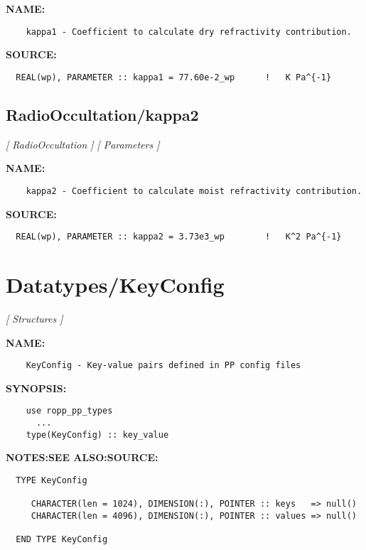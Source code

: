 \label{ch:robo93}
\label{ch:RadioOccultation_kappa1}
\textbf{NAME:}\hspace{0.08in}\begin{Verbatim}
    kappa1 - Coefficient to calculate dry refractivity contribution.
\end{Verbatim}
\textbf{SOURCE:}\hspace{0.08in}\begin{Verbatim}
  REAL(wp), PARAMETER :: kappa1 = 77.60e-2_wp      !   K Pa^{-1}
\end{Verbatim}
\subsection{RadioOccultation/kappa2}
\textsl{[ RadioOccultation ]}
\textsl{[ Parameters ]}

\label{ch:robo94}
\label{ch:RadioOccultation_kappa2}
\textbf{NAME:}\hspace{0.08in}\begin{Verbatim}
    kappa2 - Coefficient to calculate moist refractivity contribution.
\end{Verbatim}
\textbf{SOURCE:}\hspace{0.08in}\begin{Verbatim}
  REAL(wp), PARAMETER :: kappa2 = 3.73e3_wp        !   K^2 Pa^{-1}
\end{Verbatim}
\section{Datatypes/KeyConfig}
\textsl{[ Structures ]}

\label{ch:robo9}
\label{ch:Datatypes_KeyConfig}
\textbf{NAME:}\hspace{0.08in}\begin{Verbatim}
    KeyConfig - Key-value pairs defined in PP config files
\end{Verbatim}
\textbf{SYNOPSIS:}\hspace{0.08in}\begin{Verbatim}
    use ropp_pp_types
      ...
    type(KeyConfig) :: key_value
\end{Verbatim}
\textbf{NOTES:}\hspace{0.08in}\textbf{SEE ALSO:}\hspace{0.08in}\textbf{SOURCE:}\hspace{0.08in}\begin{Verbatim}
  TYPE KeyConfig

     CHARACTER(len = 1024), DIMENSION(:), POINTER :: keys   => null()
     CHARACTER(len = 4096), DIMENSION(:), POINTER :: values => null()

  END TYPE KeyConfig
\end{Verbatim}
